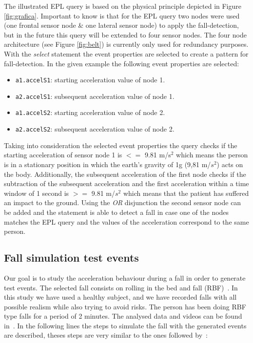 \documentclass[journal]{IEEEtran}
\begin{document}
The illustrated EPL query is based on the physical principle depicted in 
Figure \ref{fig:grafica}. Important to know is that for the EPL query two nodes 
were used (one frontal sensor node \& one lateral sensor node) to apply the 
fall-detection, but in the future this query will be extended to four sensor nodes. 
The four node architecture (see Figure \ref{fig:belt}) is currently only used 
for redundancy purposes. With the \textit{select} statement the event properties 
are selected to create a pattern for fall-detection. In the given example the
following event properties are selected:

\begin{itemize}
 \item \texttt{\small{a1.accelS1}}: starting acceleration value of node 1.
 \item \texttt{\small{a2.accelS1}}: subsequent acceleration value of node 1.
 \item \texttt{\small{a1.accelS2}}: starting acceleration value of node 2.
 \item \texttt{\small{a2.accelS2}}: subsequent acceleration value of node 2.
\end{itemize}

Taking into consideration the selected event properties the query checks if the 
starting acceleration of sensor node 1 is $<=$ 9.81 m/s$^2$ which means the person 
is in a stationary position in which the earth's gravity of 1g (9,81 m/$s^2$) acts 
on the body. Additionally, the subsequent acceleration of the first node checks if the subtraction of the subsequent acceleration and the first acceleration within a 
time window of 1 second is $>=$ 9.81 m/$s^2$ which means that the patient has 
suffered an impact to the ground. Using the \textit{OR} disjunction the second 
sensor node can be added and the statement is able to detect a fall in case one 
of the nodes matches the EPL query and the values of the acceleration correspond 
to the same person. 
 
\subsection{Fall simulation test events} 

Our goal is to study the acceleration behaviour during a fall in order to generate test events. The selected fall consists on rolling in the bed and fall (RBF)~\cite{Li2009,Pannurat2014}. In this study we have used a 
healthy subject, and we have recorded falls with all possible realism while also
trying to avoid risks. The person has been doing RBF type falls for a period of 2 minutes. The analysed 
data and videos can be found in~\cite{FallRepo}. In the following lines the steps to simulate 
the fall with the generated events are described, theses steps are very similar to the 
ones followed by~\cite{colladomachine,colladoTriaxal}:
\end{document}
